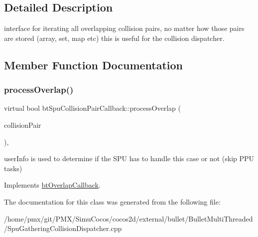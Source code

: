 \subsection{Detailed Description}
interface for iterating all overlapping collision pairs, no matter how those pairs are stored (array, set, map etc) this is useful for the collision dispatcher. 

\subsection{Member Function Documentation}
\mbox{\label{classbtSpuCollisionPairCallback_ae832c301c592c9fa65bc17e10cc3e3c2}} 
\subsubsection{\texorpdfstring{process\+Overlap()}{processOverlap()}}
{\footnotesize\ttfamily virtual bool bt\+Spu\+Collision\+Pair\+Callback\+::process\+Overlap (\begin{DoxyParamCaption}\item[{bt\+Broadphase\+Pair \&}]{collision\+Pair }\end{DoxyParamCaption})\hspace{0.3cm}{\ttfamily [inline]}, {\ttfamily [virtual]}}

user\+Info is used to determine if the S\+PU has to handle this case or not (skip P\+PU tasks) 

Implements \hyperlink{structbtOverlapCallback}{bt\+Overlap\+Callback}.



The documentation for this class was generated from the following file\+:\begin{DoxyCompactItemize}
\item 
/home/pmx/git/\+P\+M\+X/\+Simu\+Cocos/cocos2d/external/bullet/\+Bullet\+Multi\+Threaded/Spu\+Gathering\+Collision\+Dispatcher.\+cpp\end{DoxyCompactItemize}
